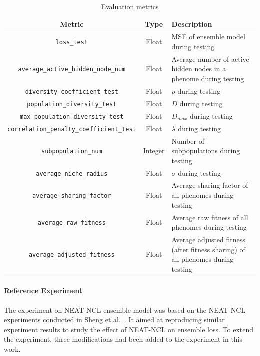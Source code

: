 \begin{table}[H]
    \centering
    \begin{tabular}{|c|c|p{5cm}|}
        \hline
        Metric & Type & Description \\
        \hline
        \small\texttt{loss\_test} & Float & MSE of ensemble model during testing \\
        \hline
        \small\texttt{average\_active\_hidden\_node\_num} & Float & Average number of active hidden nodes in a phenome during testing \\
        \hline
        \small\texttt{diversity\_coefficient\_test} & Float & $\rho$ during testing \\
        \hline
        \small\texttt{population\_diversity\_test} & Float & $D$ during testing \\
        \hline
        \small\texttt{max\_population\_diversity\_test} & Float & $D_{max}$ during testing \\
        \hline
        \small\texttt{correlation\_penalty\_coefficient\_test} & Float & $\lambda$ during testing \\
        \hline
        \small\texttt{subpopulation\_num} & Integer & Number of subpopulations during testing \\
        \hline
        \small\texttt{average\_niche\_radius} & Float & $\sigma$ during testing \\
        \hline
        \small\texttt{average\_sharing\_factor} & Float & Average sharing factor of all phenomes during testing \\
        \hline
        \small\texttt{average\_raw\_fitness} & Float & Average raw fitness of all phenomes during testing \\
        \hline
        \small\texttt{average\_adjusted\_fitness} & Float & Average adjusted fitness (after fitness sharing) of all phenomes during testing \\
        \hline
    \end{tabular}
    \caption{Evaluation metrics}
    \label{table:experiment_4_metric}
\end{table}


\paragraph{Reference Experiment}
The experiment on NEAT-NCL ensemble model was based on the NEAT-NCL experiments conducted in Sheng et al.\ \cite{sheng2017niching}. It aimed at reproducing similar experiment results to study the effect of NEAT-NCL on ensemble loss. To extend the experiment, three modifications had been added to the experiment in this work. 

